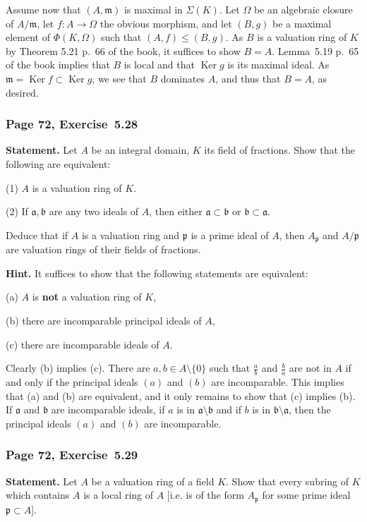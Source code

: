 \documentclass[12pt,letterpaper]{article}%
\newcommand{\mf}{\mathfrak}
\newcommand{\aaa}{\mf a}
\newcommand{\bbb}{\mf b}
\newcommand{\mmm}{\mf m}
\newcommand{\ppp}{\mf p}
\newcommand{\Ker}{\operatorname{Ker}}\newcommand{\Coker}{\operatorname{Coker}}
\newcommand{\nn}{\noindent}
\begin{document}
Assume now that $(A,\mmm)$ is maximal in $\Sigma(K)$. Let $\Omega$ be an algebraic closure of $A/\mmm$, let $f:A\to\Omega$ the obvious morphism, and let $(B,g)$ be a maximal element of $\Phi(K,\Omega)$ such that $(A,f)\le(B,g)$. As $B$ is a valuation ring of $K$ by Theorem 5.21 p.~66 of the book, it suffices to show $B=A$. Lemma~5.19 p.~65 of the book implies that $B$ is local and that $\Ker g$ is its maximal ideal. As $\mmm=\Ker f\subset\Ker g$, we see that $B$ dominates $A$, and thus that $B=A$, as desired.

\subsubsection{Page 72, Exercise~5.28}\label{528}%

\textbf{Statement.} Let $A$ be an integral domain, $K$ its field of fractions. Show that the following are equivalent:

\nn(1) $A$ is a valuation ring of $K$.

\nn(2) If $\aaa, \bbb$ are any two ideals of $A$, then either $\aaa\subset\bbb$ or $\bbb\subset\aaa$.

Deduce that if $A$ is a valuation ring and $\ppp$ is a prime ideal of $A$, then $A_\ppp$  and $A/\ppp$ are valuation rings of their fields of fractions.

\nn\textbf{Hint.} It suffices to show that the following statements are equivalent:

\nn(a) $A$ is \textbf{not} a valuation ring of $K$,

\nn(b) there are incomparable principal ideals of $A$,

\nn(c) there are incomparable ideals of $A$.

Clearly (b) implies (c). There are $a,b\in A\setminus\{0\}$ such that $\frac ab$ and $\frac ba$ are not in $A$ if and only if the principal ideals $(a)$ and $(b)$ are incomparable. This implies that (a) and (b) are equivalent, and it only remains to show that (c) implies (b). If $\aaa$ and $\bbb$ are incomparable ideals, if $a$ is in $\aaa\setminus\bbb$ and if $b$ is in $\bbb\setminus\aaa$, then the principal ideals $(a)$ and $(b)$ are incomparable.

\subsubsection{Page 72, Exercise~5.29}%

\textbf{Statement.} Let $A$ be a valuation ring of a field $K$. Show that every subring of $K$ which contains $A$ is a local ring of $A$ [i.e. is of the form $A_\ppp$ for some prime ideal $\ppp\subset A$].
\end{document}
